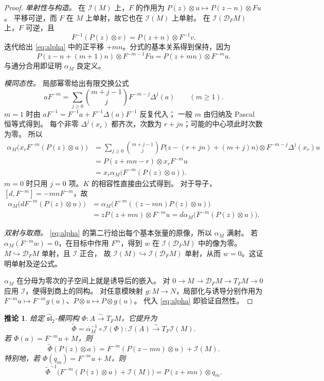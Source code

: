 \documentclass[UTF8,11pt]{ctexart}
\newcommand{\g}{\widehat{\mathfrak{sl}}_2}
\newcommand{\I}{\mathcal I}
\newcommand{\D}{\mathcal D}
\newtheorem{corollary}[theorem]{推论}
\theoremstyle{definition}
\begin{document}
\begin{proof}
\emph{单射性与构造。}
在 \(\I(M)\) 上，\(F\) 的作用为
\(P(z)\otimes u\mapsto P(z-n)\otimes Fu\)。
平移可逆，而 \(F\) 在 \(M\) 上单射，故它也在 \(\I(M)\) 上单射。
在 \(\I(\D_FM)\) 上，\(F\) 可逆，且
\[
 F^{-1}(P(z)\otimes v)=P(z+n)\otimes F^{-1}v.
\]
迭代给出 \eqref{eq:alpha} 中的正平移 \(+mn\)。分式的基本关系得到保持，因为
\[
 P(z-n+(m+1)n)\otimes F^{-m-1}Fu
 =P(z+mn)\otimes F^{-m}u.
\]
与通分合用即证明 \(\alpha_M\) 良定义。

\emph{模同态性。}
局部幂零给出有限交换公式
\begin{equation}\label{eq:finite-commutation}
 aF^{-m}=\sum_{j\ge0}\binom{m+j-1}{j}F^{-m-j}\Delta^j(a)\qquad(m\ge1).
\end{equation}
\(m=1\) 时由 \(aF^{-1}=F^{-1}a+F^{-1}\Delta(a)F^{-1}\) 反复代入；
一般 \(m\) 由归纳及 Pascal 恒等式得到。
每个非零 \(\Delta^j(x_r)\) 都齐次，次数为 \(r+jn\)；可能的中心项此时次数为零。
所以
\begin{align*}
 \alpha_M\bigl(x_rF^{-m}(P(z)\otimes u)\bigr)
 &=\sum_{j\ge0}\binom{m+j-1}{j}
 P\bigl(z-(r+jn)+(m+j)n\bigr)\otimes F^{-m-j}\Delta^j(x_r)u\\
 &=P(z+mn-r)\otimes x_rF^{-m}u\\
 &=x_r\alpha_M\bigl(F^{-m}(P(z)\otimes u)\bigr).
\end{align*}
\(m=0\) 时只用 \(j=0\) 项。\(K\) 的相容性直接由公式得到。
对于导子，\([d,F^{-m}]=-mnF^{-m}\)，故
\begin{align*}
 \alpha_M\bigl(dF^{-m}(P(z)\otimes u)\bigr)
 &=\alpha_M\bigl(F^{-m}((z-mn)P(z)\otimes u)\bigr)\\
 &=zP(z+mn)\otimes F^{-m}u
 =d\alpha_M\bigl(F^{-m}(P(z)\otimes u)\bigr).
\end{align*}

\emph{双射与取商。}
\eqref{eq:alpha} 的第二行给出每个基本张量的原像，所以 \(\alpha_M\) 满射。
若 \(\alpha_M(F^{-m}w)=0\)，在目标中作用 \(F^m\)，得到 \(w\) 在
\(\I(\D_FM)\) 中的像为零。\(M\hookrightarrow\D_FM\) 单射，且 \(\I\) 正合，
故 \(\I(M)\hookrightarrow\I(\D_FM)\) 单射，从而 \(w=0\)。这证明单射及逆公式。

\(\alpha_M\) 在分母为零次的子空间上就是诱导后的嵌入。
对 \(0\to M\to\D_FM\to T_FM\to0\) 应用 \(\I\)，便得到商上的同构。
对任意模映射 \(g:M\to N\)，局部化与诱导分别作用为
\(F^{-m}u\mapsto F^{-m}g(u)\)、\(P\otimes u\mapsto P\otimes g(u)\)。
代入 \eqref{eq:alpha} 即验证自然性。
\end{proof}

\begin{corollary}\label{cor:lift}
给定 \(\g\)-模同构 \(\Phi:A\xrightarrow{\sim}T_FM\)，它提升为
\[
 \widetilde\Phi=\overline\alpha_M^{-1}\circ\I(\Phi):
 \I(A)\xrightarrow{\sim}T_F\I(M).
\]
若 \(\Phi(a)=F^{-m}u+M\)，则
\begin{equation}\label{eq:lift}
 \widetilde\Phi(P(z)\otimes a)
 =F^{-m}(P(z-mn)\otimes u)+\I(M).
\end{equation}
特别地，若 \(\Phi(q_m)=F^{-m}u+M\)，则
\begin{equation}\label{eq:poly-preimage}
 \boxed{\ \widetilde\Phi^{-1}\bigl(F^{-m}(P(z)\otimes u)+\I(M)\bigr)
 =P(z+mn)\otimes q_m.\ }
\end{equation}
\end{corollary}
\end{document}
